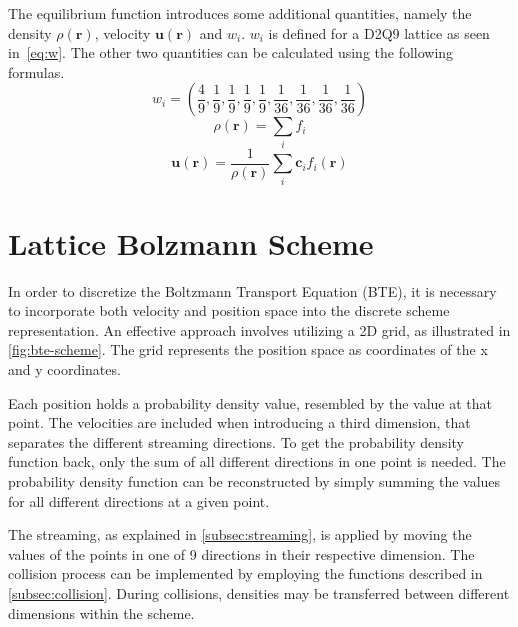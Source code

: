 The equilibrium function introduces some additional quantities, namely the density \(\rho(\mathbf{r})\), velocity \(\mathbf{u}(\mathbf{r})\) and \(w_i\).
\(w_i\) is defined for a D2Q9 lattice as seen in~\cref{eq:w}.
The other two quantities can be calculated using the following formulas.
\begin{equation}
    w_i = \left(\dfrac{4}{9},
    \dfrac{1}{9}, \dfrac{1}{9}, \dfrac{1}{9}, \dfrac{1}{9},
    \dfrac{1}{36}, \dfrac{1}{36}, \dfrac{1}{36}, \dfrac{1}{36}\right)
    \label{eq:w}
\end{equation}
\begin{equation}
    \rho(\mathbf{r})=\sum_i f_i
    \label{eq:rho}
\end{equation}
\begin{equation}
    \mathbf{u}(\mathbf{r})=
    \frac{1}{\rho(\mathbf{r})}\sum_i \mathbf{c}_i f_i(\mathbf{r})
    \label{eq:u}
\end{equation}


\section{Lattice Bolzmann Scheme}

In order to discretize the Boltzmann Transport Equation (BTE), it is necessary to incorporate both velocity and position space into the discrete scheme representation.
An effective approach involves utilizing a 2D grid, as illustrated in \cref{fig:bte-scheme}.
The grid represents the position space as coordinates of the x and y coordinates.
\newline

Each position holds a probability density value, resembled by the value at that point.
The velocities are included when introducing a third dimension, that separates the different streaming directions.
To get the probability density function back, only the sum of all different directions in one point is needed.
The probability density function can be reconstructed by simply summing the values for all different directions at a given point.
\newline

The streaming, as explained in \cref{subsec:streaming}, is applied by moving the values of the points in one of 9 directions in their respective dimension.
The collision process can be implemented by employing the functions described in \cref{subsec:collision}.
During collisions, densities may be transferred between different dimensions within the scheme.

